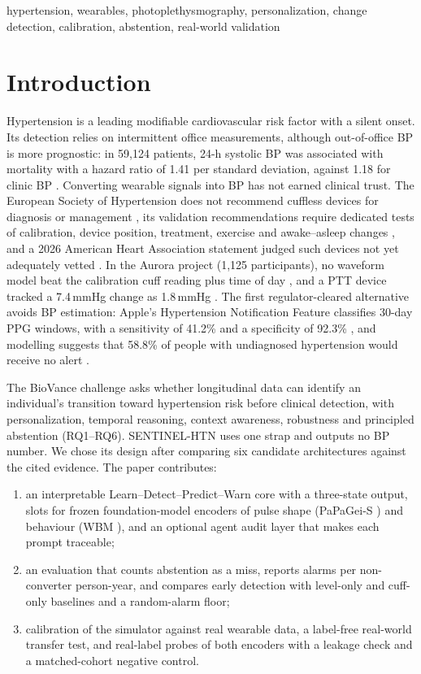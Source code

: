 \documentclass[conference]{IEEEtran}
\begin{document}
\begin{IEEEkeywords}
hypertension, wearables, photoplethysmography, personalization, change detection, calibration, abstention, real-world validation
\end{IEEEkeywords}

\section{Introduction}
Hypertension is a leading modifiable cardiovascular risk factor with a silent onset. Its detection relies on intermittent office measurements, although out-of-office BP is more prognostic: in 59,124 patients, 24-h systolic BP was associated with mortality with a hazard ratio of 1.41 per standard deviation, against 1.18 for clinic BP \cite{staplin2023}. Converting wearable signals into BP has not earned clinical trust. The European Society of Hypertension does not recommend cuffless devices for diagnosis or management \cite{esh2022}, its validation recommendations require dedicated tests of calibration, device position, treatment, exercise and awake--asleep changes \cite{stergiou2023}, and a 2026 American Heart Association statement judged such devices not yet adequately vetted \cite{aha2026}. In the Aurora project (1,125 participants), no waveform model beat the calibration cuff reading plus time of day \cite{mukkamala2023}, and a PTT device tracked a 7.4\,mmHg change as 1.8\,mmHg \cite{derendinger2024}. The first regulator-cleared alternative avoids BP estimation: Apple's Hypertension Notification Feature classifies 30-day PPG windows, with a sensitivity of 41.2\% and a specificity of 92.3\% \cite{k250507}, and modelling suggests that 58.8\% of people with undiagnosed hypertension would receive no alert \cite{cohen2026}.

The BioVance challenge asks whether longitudinal data can identify an individual's transition toward hypertension risk before clinical detection, with personalization, temporal reasoning, context awareness, robustness and principled abstention (RQ1--RQ6). SENTINEL-HTN uses one strap and outputs no BP number. We chose its design after comparing six candidate architectures against the cited evidence. The paper contributes:
\begin{enumerate}
\item an interpretable Learn--Detect--Predict--Warn core with a three-state output, slots for frozen foundation-model encoders of pulse shape (PaPaGei-S \cite{papagei2025}) and behaviour (WBM \cite{erturk2025,openmhc2026}), and an optional agent audit layer that makes each prompt traceable;
\item an evaluation that counts abstention as a miss, reports alarms per non-converter person-year, and compares early detection with level-only and cuff-only baselines and a random-alarm floor;
\item calibration of the simulator against real wearable data, a label-free real-world transfer test, and real-label probes of both encoders with a leakage check and a matched-cohort negative control.
\end{enumerate}
\end{document}
